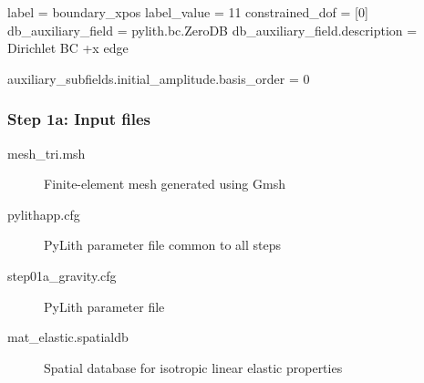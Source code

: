 \documentclass[aspectratio=169]{beamer}
\begin{document}
\begin{frame}[t,fragile]
\begin{minipage}[t]{0.67\textwidth}
\begin{onlyenv}
\begin{cfgcode}
        label = boundary_xpos
        label_value = 11
        constrained_dof = [0]
        db_auxiliary_field = pylith.bc.ZeroDB
        db_auxiliary_field.description = Dirichlet BC +x edge

        auxiliary_subfields.initial_amplitude.basis_order = 0 
      \end{cfgcode}
    \end{onlyenv}
  \end{minipage}

  
\end{frame}


\begin{frame}
  \frametitle{Step 1a: Input files}
  \summary{}

  \begin{description}
  \item[mesh\_tri.msh] Finite-element mesh generated using Gmsh
  \item[pylithapp.cfg] PyLith parameter file common to all steps
  \item[step01a\_gravity.cfg] PyLith parameter file
  \item[mat\_elastic.spatialdb] Spatial database for isotropic linear elastic properties
  \end{description}
    
\end{frame}
\end{document}
